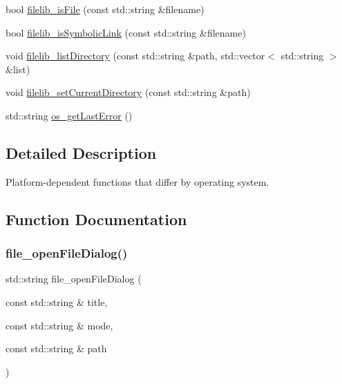 \begin{DoxyCompactItemize}
bool \mbox{\hyperlink{namespaceplatform_aca0d9e2b4896bfd0f7a5cd64049188fc}{filelib\+\_\+is\+File}} (const std\+::string \&filename)
\item 
bool \mbox{\hyperlink{namespaceplatform_a69dc63b6fb991650c05dde15b04ca465}{filelib\+\_\+is\+Symbolic\+Link}} (const std\+::string \&filename)
\item 
void \mbox{\hyperlink{namespaceplatform_acad9142fb05b5756d75b8f8a68b5558b}{filelib\+\_\+list\+Directory}} (const std\+::string \&path, std\+::vector$<$ std\+::string $>$ \&list)
\item 
void \mbox{\hyperlink{namespaceplatform_afe79a966d14e3b8d08939712884fa9d3}{filelib\+\_\+set\+Current\+Directory}} (const std\+::string \&path)
\item 
std\+::string \mbox{\hyperlink{namespaceplatform_a33caced893c9dd544cd80f354c5ec359}{os\+\_\+get\+Last\+Error}} ()
\end{DoxyCompactItemize}


\subsection{Detailed Description}
Platform-\/dependent functions that differ by operating system. 

\subsection{Function Documentation}
\mbox{\label{namespaceplatform_aa812fb80e0cb15f75d35975ea91e8f2b}} 
\subsubsection{\texorpdfstring{file\+\_\+open\+File\+Dialog()}{file\_openFileDialog()}}
{\footnotesize\ttfamily std\+::string file\+\_\+open\+File\+Dialog (\begin{DoxyParamCaption}\item[{const std\+::string \&}]{title,  }\item[{const std\+::string \&}]{mode,  }\item[{const std\+::string \&}]{path }\end{DoxyParamCaption})}

\mbox{\label{namespaceplatform_aa30655cd42c277a7c5ed7aba21cf0050}} 
